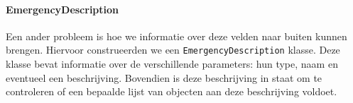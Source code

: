 \paragraph{EmergencyDescription}
Een ander probleem is hoe we informatie over deze velden naar buiten kunnen brengen. Hiervoor construeerden we een \verb+EmergencyDescription+ klasse. Deze klasse bevat informatie over de verschillende parameters: hun type, naam en eventueel een beschrijving. Bovendien is deze beschrijving in staat om te controleren of een bepaalde lijst van objecten aan deze beschrijving voldoet.